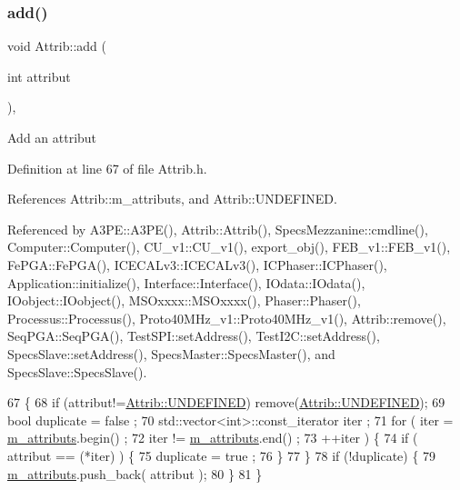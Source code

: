 \subsubsection{\texorpdfstring{add()}{add()}}
{\footnotesize\ttfamily void Attrib\+::add (\begin{DoxyParamCaption}\item[{int}]{attribut }\end{DoxyParamCaption})\hspace{0.3cm}{\ttfamily [inline]}, {\ttfamily [inherited]}}

Add an attribut 

Definition at line 67 of file Attrib.\+h.



References Attrib\+::m\+\_\+attributs, and Attrib\+::\+U\+N\+D\+E\+F\+I\+N\+ED.



Referenced by A3\+P\+E\+::\+A3\+P\+E(), Attrib\+::\+Attrib(), Specs\+Mezzanine\+::cmdline(), Computer\+::\+Computer(), C\+U\+\_\+v1\+::\+C\+U\+\_\+v1(), export\+\_\+obj(), F\+E\+B\+\_\+v1\+::\+F\+E\+B\+\_\+v1(), Fe\+P\+G\+A\+::\+Fe\+P\+G\+A(), I\+C\+E\+C\+A\+Lv3\+::\+I\+C\+E\+C\+A\+Lv3(), I\+C\+Phaser\+::\+I\+C\+Phaser(), Application\+::initialize(), Interface\+::\+Interface(), I\+Odata\+::\+I\+Odata(), I\+Oobject\+::\+I\+Oobject(), M\+S\+Oxxxx\+::\+M\+S\+Oxxxx(), Phaser\+::\+Phaser(), Processus\+::\+Processus(), Proto40\+M\+Hz\+\_\+v1\+::\+Proto40\+M\+Hz\+\_\+v1(), Attrib\+::remove(), Seq\+P\+G\+A\+::\+Seq\+P\+G\+A(), Test\+S\+P\+I\+::set\+Address(), Test\+I2\+C\+::set\+Address(), Specs\+Slave\+::set\+Address(), Specs\+Master\+::\+Specs\+Master(), and Specs\+Slave\+::\+Specs\+Slave().


\begin{DoxyCode}
67                             \{
68     \textcolor{keywordflow}{if} (attribut!=\hyperlink{classAttrib_a69e171d7cc6417835a5a306d3c764235a3a8da2ab97dda18aebab196fe4100531}{Attrib::UNDEFINED}) \textcolor{keyword}{remove}(\hyperlink{classAttrib_a69e171d7cc6417835a5a306d3c764235a3a8da2ab97dda18aebab196fe4100531}{Attrib::UNDEFINED});
69     \textcolor{keywordtype}{bool} duplicate = false ;
70     std::vector<int>::const\_iterator iter ;
71     \textcolor{keywordflow}{for} ( iter  = \hyperlink{classAttrib_ac4bd58a0cc6b38a3b711d609a3d3aacc}{m\_attributs}.begin() ;
72           iter != \hyperlink{classAttrib_ac4bd58a0cc6b38a3b711d609a3d3aacc}{m\_attributs}.end()   ;
73           ++iter ) \{
74       \textcolor{keywordflow}{if} ( attribut == (*iter) ) \{
75         duplicate = true ;
76       \}
77     \}
78     \textcolor{keywordflow}{if} (!duplicate) \{
79       \hyperlink{classAttrib_ac4bd58a0cc6b38a3b711d609a3d3aacc}{m\_attributs}.push\_back( attribut );
80     \}
81   \}
\end{DoxyCode}
\mbox{\label{classProcessus_a308c8f193802f1d1ab49d4447d0cb281}} 
